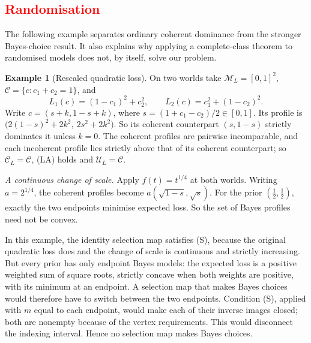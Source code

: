 \documentclass[11pt]{article}
\theoremstyle{definition}
\newtheorem{example}[theorem]{Example}
\theoremstyle{remark}
\newcommand{\M}{\mathcal M}
\newcommand{\C}{\mathcal C}
\newcommand{\U}{\mathcal U}
\begin{document}
\subsection{\textcolor{red}{Randomisation}}\label{sec:random}
The following example separates ordinary coherent dominance from the stronger Bayes-choice result. It also explains why applying a complete-class theorem to randomised models does not, by itself, solve our problem.
\begin{example}[Rescaled quadratic loss]\label{ex:rescale}
On two worlds take $\M_L=[0,1]^2$, $\C=\{c:c_1+c_2=1\}$, and
\[
 L_1(c)=(1-c_1)^2+c_2^2,\qquad L_2(c)=c_1^2+(1-c_2)^2.
\]
Write $c=(s+k,1-s+k)$, where $s=(1+c_1-c_2)/2\in[0,1]$. Its profile is $\bigl(2(1-s)^2+2k^2,\ 2s^2+2k^2\bigr)$. So its coherent counterpart $(s,1-s)$ strictly dominates it unless $k=0$. The coherent profiles are pairwise incomparable, and each incoherent profile lies strictly above that of its coherent counterpart; so $\C_L=\C$, (LA) holds and $\U_L=\C$.

\emph{A continuous change of scale.} Apply $f(t)=t^{1/4}$ at both worlds. Writing $a=2^{1/4}$, the coherent profiles become $a(\sqrt{1-s},\sqrt s)$. For the prior $(\tfrac12,\tfrac12)$, exactly the two endpoints minimise expected loss. So the set of Bayes profiles need not be convex.

\end{example}

In this example, the identity selection map satisfies (S), because the original quadratic loss does and the change of scale is continuous and strictly increasing. But every prior has only endpoint Bayes models: the expected loss is a positive weighted sum of square roots, strictly concave when both weights are positive, with its minimum at an endpoint. A selection map that makes Bayes choices would therefore have to switch between the two endpoints. Condition (S), applied with $m$ equal to each endpoint, would make each of their inverse images closed; both are nonempty because of the vertex requirements. This would disconnect the indexing interval. Hence no selection map makes Bayes choices.\label{rem:bayeschoice}
\end{document}
